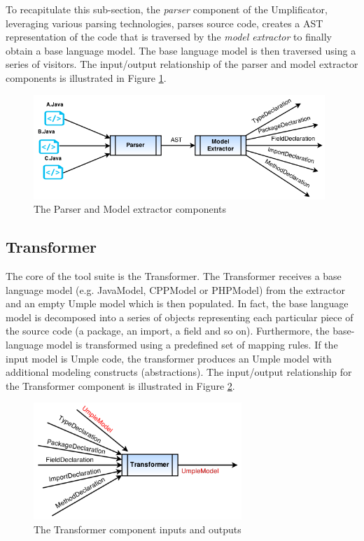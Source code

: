 To recapitulate this sub-section, the \textit{parser} component of the Umplificator, leveraging various parsing technologies, parses source code, creates a AST representation of the code that is traversed by the \textit{model extractor} to finally obtain a base language model. The base language model is then traversed using a series of visitors. The input/output relationship of the parser and model extractor components is illustrated in Figure \ref{fig:parserINOut}. 

\begin{figure}[h]
\centering
\includegraphics[width=0.98\textwidth]{Figures/parserINOut.png}
\caption{The Parser and Model extractor components}
\label{fig:parserINOut}
\end{figure}

\subsection{Transformer}

The core of the tool suite is the Transformer. The Transformer receives a base language model (e.g. JavaModel, CPPModel or PHPModel) from the extractor and an empty Umple model which is then populated. In fact, the base language model is decomposed into a series of objects representing each particular piece of the source code (a package, an import, a field and so on). Furthermore, the base-language model is transformed using a predefined set of mapping rules. If the input model is Umple code, the transformer produces an Umple model with additional modeling constructs (abstractions). The input/output relationship for the Transformer component is illustrated in Figure 
\ref{fig:transformerInOut}.

\begin{figure}[h]
\centering
\includegraphics[width=0.70\textwidth]{Figures/transformerINOut.png}
\caption{The Transformer component inputs and outputs}
\label{fig:transformerInOut}
\end{figure}

